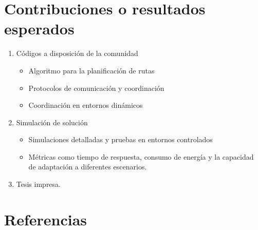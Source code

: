 \documentclass[11pt,epsf,times]{article}
\begin{document}
\section{Contribuciones o resultados esperados}

\begin{enumerate}
\item Códigos a disposición de la comunidad
  \begin{itemize}
  \item Algoritmo para la planificación de rutas
  \item Protocolos de comunicación y coordinación
  \item Coordinación en entornos dinámicos
  \end{itemize}
\item Simulación de solución
  \begin{itemize}
  \item Simulaciones detalladas y pruebas en entornos controlados
  \item Métricas como tiempo de respuesta, consumo de energía y la capacidad de adaptación a diferentes escenarios. 
  \end{itemize}
\item Tesis impresa.
\end{enumerate}

\newpage
\section{Referencias}
\end{document}

